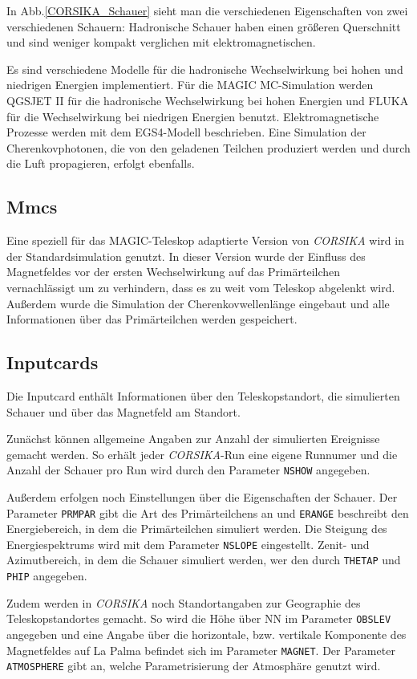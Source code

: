 In Abb.\ref{CORSIKA_Schauer} sieht man die verschiedenen Eigenschaften von zwei verschiedenen Schauern: Hadronische Schauer haben einen größeren Querschnitt und sind weniger kompakt verglichen mit elektromagnetischen.

Es sind verschiedene Modelle für die hadronische Wechselwirkung bei hohen und niedrigen Energien implementiert.
Für die MAGIC MC-Simulation werden QGSJET II für die hadronische Wechselwirkung bei hohen Energien und FLUKA für die Wechselwirkung bei niedrigen Energien benutzt.
Elektromagnetische Prozesse werden mit dem EGS4-Modell beschrieben.
Eine Simulation der Cherenkovphotonen, die von den geladenen Teilchen produziert werden und durch die Luft propagieren, erfolgt ebenfalls.

\subsection{Mmcs}
Eine speziell für das MAGIC-Teleskop adaptierte Version von \textit{CORSIKA} wird in der Standardsimulation genutzt.
In dieser Version wurde der Einfluss des Magnetfeldes vor der ersten Wechselwirkung auf das Primärteilchen vernachlässigt um zu verhindern, dass es zu weit vom Teleskop abgelenkt wird.
Außerdem wurde die Simulation der Cherenkovwellenlänge eingebaut und alle Informationen über das Primärteilchen werden gespeichert.

\subsection{Inputcards}
Die Inputcard enthält Informationen über den Teleskopstandort, die simulierten Schauer und über das Magnetfeld am Standort.

Zunächst können allgemeine Angaben zur Anzahl der simulierten Ereignisse gemacht werden. 
So erhält jeder \textit{CORSIKA}-Run eine eigene Runnumer und die Anzahl der Schauer pro Run wird durch den Parameter \texttt{NSHOW} angegeben.

Außerdem erfolgen noch Einstellungen über die Eigenschaften der Schauer.
Der Parameter \texttt{PRMPAR} gibt die Art des Primärteilchens an und \texttt{ERANGE} beschreibt den Energiebereich, in dem die Primärteilchen simuliert werden.
Die Steigung des Energiespektrums wird mit dem Parameter \texttt{NSLOPE} eingestellt.
Zenit- und Azimutbereich, in dem die Schauer simuliert werden, wer den durch \texttt{THETAP} und \texttt{PHIP} angegeben.

Zudem werden in \textit{CORSIKA} noch Standortangaben zur Geographie des Teleskopstandortes gemacht.
So wird die Höhe über NN im Parameter \texttt{OBSLEV} angegeben und eine Angabe über die horizontale, bzw. vertikale Komponente des Magnetfeldes auf La Palma befindet sich im Parameter \texttt{MAGNET}.
Der Parameter \texttt{ATMOSPHERE} gibt an, welche Parametrisierung der Atmosphäre genutzt wird.

